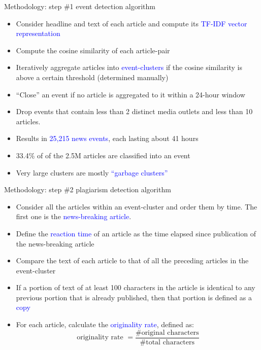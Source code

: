 \documentclass[english]{beamer}
\begin{document}
\begin{frame}{Methodology: step \#1 event detection algorithm}
    \begin{itemize}
    \setlength{\itemsep}{0.8em}
        \item Consider headline and text of each article and compute its \textcolor{blue}{TF-IDF vector representation}
        \item Compute the cosine similarity of each article-pair
        \item Iteratively aggregate articles into \textcolor{blue}{event-clusters} if the cosine similarity is above a certain threshold (determined manually)
        \item ``Close'' an event if no article is aggregated to it within a 24-hour window
        \item Drop events that contain less than 2 distinct media outlets and less than 10 articles.
        \item Results in \textcolor{blue}{25,215 news events}, each lasting about 41 hours
        \item 33.4\% of of the 2.5M articles are classified into an event %
        \item Very large clusters are mostly \textcolor{blue}{``garbage clusters''}
    \end{itemize}
\end{frame}

\begin{frame}{Methodology: step \#2 plagiarism detection algorithm}
    \begin{itemize}
\setlength{\itemsep}{0.8em}
 \item Consider all the articles within an event-cluster and order them by time. The first one is the \textcolor{blue}{news-breaking article}.
\item Define the \textcolor{blue}{reaction time} of an article as the time elapsed since publication of the news-breaking article
\item Compare the text of each article to that of all the preceding articles in the event-cluster
\item If a portion of text of at least 100 characters in the article is identical to any previous portion that is already published, then that portion is defined as a \textcolor{blue}{copy}
        \item For each article, calculate the \textcolor{blue}{originality rate}, defined as:
        \begin{equation*}
            \text{originality rate } = \frac{\text{\# original characters}}{\text{\# total characters}}
        \end{equation*}
    \end{itemize}
\end{frame}
\end{document}
